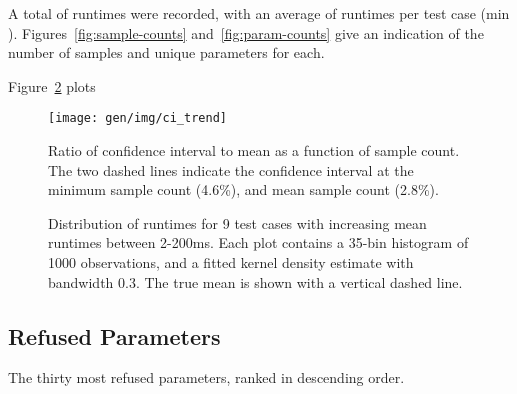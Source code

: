 A total of  runtimes were recorded, with an
average of  runtimes per test case (min
). Figures~\ref{fig:sample-counts}
and~\ref{fig:param-counts} give an indication of the number of samples
and unique parameters for each.

\begin{figure}
  
\caption{\TODO{\ldots}}
\label{fig:num-samples}
\end{figure}

Figure~\ref{fig:ci-trends} plots

\begin{figure}
\centering
\texttt{[image: gen/img/ci\_trend]}
\caption{%
  Ratio of confidence interval to mean as a function of sample
  count. The two dashed lines indicate the confidence interval at the
  minimum sample count (4.6\%), and mean sample count (2.8\%).%
}
\label{fig:ci-trends}
\end{figure}


\begin{figure}

\caption{%
  Distribution of runtimes for 9 test cases with increasing mean
  runtimes between 2-200ms. Each plot contains a 35-bin histogram of
  1000 observations, and a fitted kernel density estimate with
  bandwidth 0.3. The true mean is shown with a vertical dashed line. %
}
\label{fig:runtime-histograms}
\end{figure}


\subsection{Refused Parameters}




\begin{table}
\parbox{.32\linewidth}{
    \centering
    \scriptsize
    
  }
  \hfill
  \parbox{.32\linewidth}{
    \centering
    \scriptsize
    
  }
  \hfill
  \parbox{.32\linewidth}{
    \centering
    \scriptsize
    
  }
  \caption{The thirty most refused parameters, ranked in descending order.}
\end{table}


